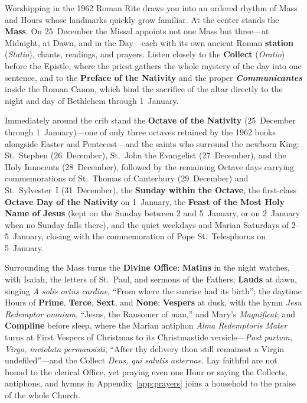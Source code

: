 Worshipping in the 1962 Roman Rite draws you into an ordered rhythm of Mass and
Hours whose landmarks quickly grow familiar. At the center stands the
\textbf{Mass}. On 25~December the Missal appoints not one Mass but three---at
Midnight, at Dawn, and in the Day---each with its own ancient Roman
\textbf{station} (\textit{Statio}), chants, readings, and prayers. Listen closely
to the \textbf{Collect} (\textit{Oratio}) before the Epistle, where the priest
gathers the whole mystery of the day into one sentence, and to the
\textbf{Preface of the Nativity} and the proper \textbf{\textit{Communicantes}}
inside the Roman Canon, which bind the sacrifice of the altar directly to the
night and day of Bethlehem through 1~January.

Immediately around the crib stand the \textbf{Octave of the Nativity}
(25~December through 1~January)---one of only three octaves retained by the
1962 books alongside Easter and Pentecost---and the saints who surround the
newborn King: St.~Stephen (26~December), St.~John the Evangelist (27~December),
and the Holy Innocents (28~December), followed by the remaining Octave days
carrying commemorations of St.~Thomas of Canterbury (29~December) and
St.~Sylvester~I (31~December), the \textbf{Sunday within the Octave}, the
first-class \textbf{Octave Day of the Nativity} on 1~January, the \textbf{Feast
of the Most Holy Name of Jesus} (kept on the Sunday between 2 and 5~January, or
on 2~January when no Sunday falls there), and the quiet weekdays and Marian
Saturdays of 2--5~January, closing with the commemoration of Pope
St.~Telesphorus on 5~January.

Surrounding the Mass turns the \textbf{Divine Office}: \textbf{Matins} in the
night watches, with Isaiah, the letters of St.~Paul, and sermons of the Fathers;
\textbf{Lauds} at dawn, singing \textit{A solis ortus cardine}, ``From where the
sunrise had its birth''; the daytime Hours of \textbf{Prime}, \textbf{Terce},
\textbf{Sext}, and \textbf{None}; \textbf{Vespers} at dusk, with the hymn
\textit{Jesu Redemptor omnium}, ``Jesus, the Ransomer of man,'' and Mary's
\textit{Magnificat}; and \textbf{Compline} before sleep, where the Marian
antiphon \textit{Alma Redemptoris Mater} turns at First Vespers of Christmas to
its Christmastide versicle---\textit{Post partum, Virgo, inviolata permansisti},
``After thy delivery thou still remainest a Virgin undefiled''---and the Collect
\textit{Deus, qui salutis aeternae}. Lay faithful are not bound to the clerical
Office, yet praying even one Hour or saying the Collects, antiphons, and hymns
in Appendix~\ref{app:prayers} joins a household to the praise of the whole
Church.

